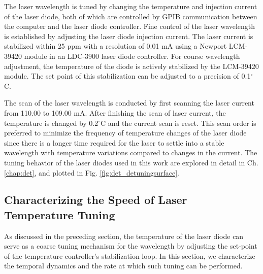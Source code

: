 \documentclass[8pt,a4paper]{report}
\begin{document}
	The laser wavelength is tuned by changing the temperature and injection current of the
	laser diode, both of which are controlled by GPIB communication between the computer
	and the laser diode controller. Fine control of the laser wavelength is
	established by adjusting the laser diode injection current. The laser current is stabilized
	within 25 ppm with a resolution of 0.01 mA using a Newport LCM-39420 module in an
	LDC-3900 laser diode controller. For course wavelength adjustment, the temperature of the
	diode is actively stabilized by the LCM-39420 module. The set point of this stabilization can be adjusted to a precision of 0.1$^\circ$C.
	
	
	
	The scan of the laser wavelength is conducted by first scanning the laser current from 110.00 to 109.00 mA. After finishing the scan of laser current, the temperature is changed by 0.2$^\circ$C and the current scan is reset. This scan order is preferred to minimize the frequency of temperature changes of the laser diode since there is a longer time required for the laser to settle into a stable wavelength with temperature variations compared to changes in the current. The tuning behavior of the laser diodes used in this work are explored in detail in Ch. \ref{chap:det}, and plotted in Fig. \ref{fig:det_detuningsurface}.
	
	\subsection{Characterizing the Speed of Laser Temperature Tuning} \label{sec:crds_tuning_speed}
	As discussed in the preceding section, the temperature of the laser diode can serve as a coarse tuning mechanism for the wavelength by adjusting the set-point of the temperature controller's stabilization loop. In this section, we characterize the temporal dynamics and the rate at which such tuning can be performed.
	
\end{document}
